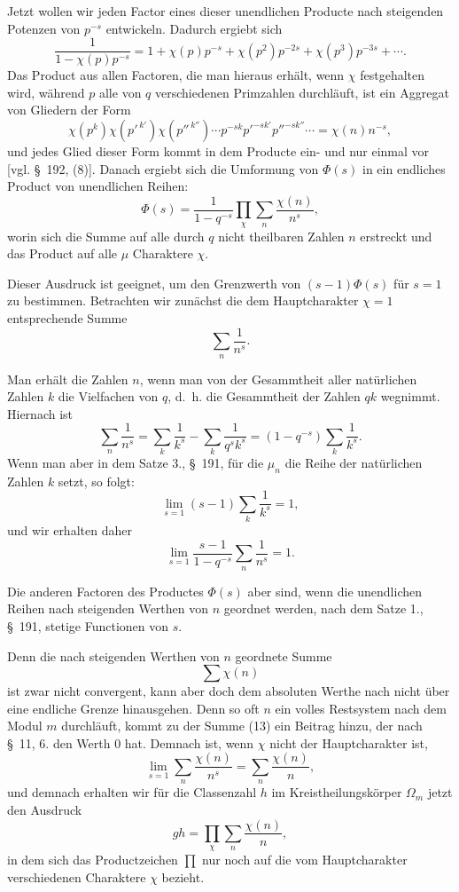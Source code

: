 \documentclass[11pt]{article}
\begin{document}
Jetzt wollen wir jeden Factor eines dieser unendlichen Producte nach steigenden Potenzen von $p^{-s}$ entwickeln. Dadurch ergiebt sich
\[
\frac1{1-\chi(p)p^{-s}}
=1+\chi(p)p^{-s}+\chi(p^2)p^{-2s}+\chi(p^3)p^{-3s}+\cdots .
\]
Das Product aus allen Factoren, die man hieraus erhält, wenn $\chi$ festgehalten wird, während $p$ alle von $q$ verschiedenen Primzahlen durchläuft, ist ein Aggregat von Gliedern der Form
\[
\chi(p^k)\chi(p'^{\,k'})\chi(p''^{\,k''})\cdots p^{-sk}p'^{-sk'}p''^{-sk''}\cdots
=\chi(n)n^{-s},
\]
und jedes Glied dieser Form kommt in dem Producte ein- und nur einmal vor [vgl. \S~192, (8)]. Danach ergiebt sich die Umformung von $\Phi(s)$ in ein endliches Product von unendlichen Reihen:
\begin{equation}
\Phi(s)=\frac1{1-q^{-s}}\prod_\chi\sum_n\frac{\chi(n)}{n^s},
\tag{11}
\end{equation}
worin sich die Summe auf alle durch $q$ nicht theilbaren Zahlen $n$ erstreckt und das Product auf alle $\mu$ Charaktere $\chi$.

Dieser Ausdruck ist geeignet, um den Grenzwerth von $(s-1)\Phi(s)$ für $s=1$ zu bestimmen. Betrachten wir zunächst die dem Hauptcharakter $\chi=1$ entsprechende Summe
\[
\sum_n\frac1{n^s}.
\]

Man erhält die Zahlen $n$, wenn man von der Gesammtheit aller natürlichen Zahlen $k$ die Vielfachen von $q$, d.\ h. die Gesammtheit der Zahlen $qk$ wegnimmt. Hiernach ist
\[
\sum_n\frac1{n^s}=\sum_k\frac1{k^s}-\sum_k\frac1{q^s k^s}
=(1-q^{-s})\sum_k\frac1{k^s}.
\]
Wenn man aber in dem Satze 3., \S~191, für die $\mu_n$ die Reihe der natürlichen Zahlen $k$ setzt, so folgt:
\[
\lim_{s=1}(s-1)\sum_k\frac1{k^s}=1,
\]
und wir erhalten daher
\begin{equation}
\lim_{s=1}\frac{s-1}{1-q^{-s}}\sum_n\frac1{n^s}=1.
\tag{12}
\end{equation}

Die anderen Factoren des Productes $\Phi(s)$ aber sind, wenn die unendlichen Reihen nach steigenden Werthen von $n$ geordnet werden, nach dem Satze 1., \S~191, stetige Functionen von $s$.

Denn die nach steigenden Werthen von $n$ geordnete Summe
\begin{equation}
\sum\chi(n)
\tag{13}
\end{equation}
ist zwar nicht convergent, kann aber doch dem absoluten Werthe nach nicht über eine endliche Grenze hinausgehen. Denn so oft $n$ ein volles Restsystem nach dem Modul $m$ durchläuft, kommt zu der Summe (13) ein Beitrag hinzu, der nach \S~11, 6. den Werth $0$ hat. Demnach ist, wenn $\chi$ nicht der Hauptcharakter ist,
\begin{equation}
\lim_{s=1}\sum_n\frac{\chi(n)}{n^s}=\sum_n\frac{\chi(n)}{n},
\tag{14}
\end{equation}
und demnach erhalten wir für die Classenzahl $h$ im Kreistheilungskörper $\Omega_m$ jetzt den Ausdruck
\begin{equation}
gh=\prod_\chi\sum_n\frac{\chi(n)}{n},
\tag{15}
\end{equation}
in dem sich das Productzeichen $\prod$ nur noch auf die vom Hauptcharakter verschiedenen Charaktere $\chi$ bezieht.
\end{document}
